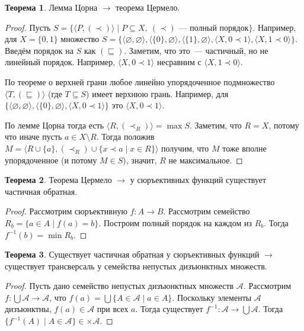 \documentclass[a4paper,11pt]{article}
\theoremstyle{definition}
\newtheorem*{thm}{Теорема}
\begin{document}
\begin{thm}
Лемма Цорна $\to$ теорема Цермело.
\end{thm}
\begin{proof}
Пусть $S = \{\langle P, (\prec)\rangle \mid P \subseteq X,\ (\prec)$ --- полный
порядок$\}$. Например, для $X = \{0, 1\}$ множество $S = \{\langle\varnothing,
\varnothing\rangle, \langle\{0\}, \varnothing\rangle, \langle\{1\},
\varnothing\rangle, \langle X, 0 \prec 1\rangle, \langle X, 1 \prec
0\rangle\}$. Введём порядок на $S$ как $(\sqsubseteq)$. Заметим, что это~---
частичный, но не линейный порядок. Например, $\langle X, 0 \prec 1\rangle$
несравним с $\langle X, 1 \prec 0\rangle$.

По теореме о верхней грани любое линейно упорядоченное подмножество $\langle T,
(\sqsubseteq)\rangle$ (где $T \subseteq S$) имеет верхнюю грань. Например, для
$\{\langle\varnothing, \varnothing\rangle, \langle\{0\}, \varnothing\rangle,
\langle X, 0 \prec 1\rangle\}$ это $\langle X, 0 \prec 1\rangle$.

По лемме Цорна тогда есть $\langle R, (\prec_R)\rangle = \max S$. Заметим, что $R
= X$, потому что иначе пусть $a \in X \setminus R$. Тогда положив $M = \langle R
\cup \{a\}, (\prec_R) \cup \{x \prec a \mid x \in R\}\rangle$ получим, что $M$
тоже вполне упорядоченное (и потому $M \in S$), значит, $R$ не максимальное.
\end{proof}

\begin{thm}
Теорема Цермело $\to$ у сюръективных функций существует частичная обратная.
\end{thm}
\begin{proof}
Рассмотрим сюръективную $f : A \to B$. Рассмотрим семейство $R_b = \{a \in A
\mid f(a) = b\}$. Построим полный порядок на каждом из $R_b$. Тогда $f^{-1}(b)
= \min R_b$.
\end{proof}
\begin{thm}
Существует частичная обратная у сюръективных функций $\to$ существует
трансверсаль у семейства непустых дизъюнктных множеств.
\end{thm}
\begin{proof}
Пусть дано семейство непустых дизъюнктных множеств $\mathcal{A}$. Рассмотрим $f
: \bigcup\mathcal{A} \to \mathcal{A}$, что $f(a) = \bigcup\{A \in \mathcal{A}
\mid a \in A\}$. Поскольку элементы $\mathcal{A}$ дизъюнктны, $f(a) \in
\mathcal{A}$ при всех $a$. Тогда существует $f^{-1} : \mathcal{A} \to
\bigcup\mathcal{A}$. Тогда $\{f^{-1}(A) \mid A \in \mathcal{A}\} \in
\times\mathcal{A}$.
\end{proof}
\end{document}
